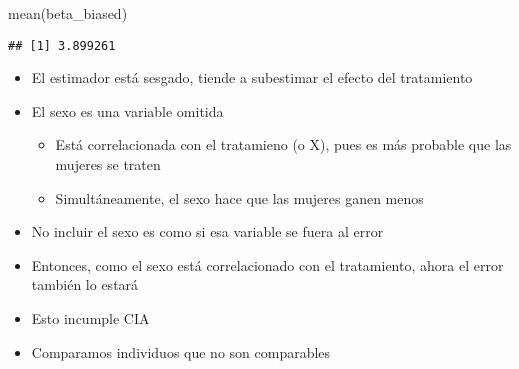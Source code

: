 \documentclass[
  ignorenonframetext,
]{beamer}
\newenvironment{Shaded}{\begin{snugshade}}{\end{snugshade}}
\newcommand{\FunctionTok}[1]{\textcolor[rgb]{0.00,0.00,0.00}{#1}}
\newcommand{\NormalTok}[1]{#1}
\providecommand{\tightlist}{%
  \setlength{\itemsep}{0pt}\setlength{\parskip}{0pt}}
\begin{document}
\begin{frame}[fragile]{}
\protect\hypertarget{section-32}{}
\begin{Shaded}
\begin{Highlighting}[]
\FunctionTok{mean}\NormalTok{(beta\_biased)}
\end{Highlighting}
\end{Shaded}

\begin{verbatim}
## [1] 3.899261
\end{verbatim}

\begin{itemize}
\tightlist
\item
  El estimador está sesgado, tiende a subestimar el efecto del
  tratamiento
\item
  El sexo es una variable omitida

  \begin{itemize}
  \tightlist
  \item
    Está correlacionada con el tratamieno (o X), pues es más probable
    que las mujeres se traten
  \item
    Simultáneamente, el sexo hace que las mujeres ganen menos
  \end{itemize}
\end{itemize}
\end{frame}

\begin{frame}{}
\protect\hypertarget{section-33}{}
\begin{itemize}
\tightlist
\item
  No incluir el sexo es como si esa variable se fuera al error
\item
  Entonces, como el sexo está correlacionado con el tratamiento, ahora
  el error también lo estará
\item
  Esto incumple CIA
\item
  Comparamos individuos que no son comparables
\end{itemize}
\end{frame}
\end{document}
